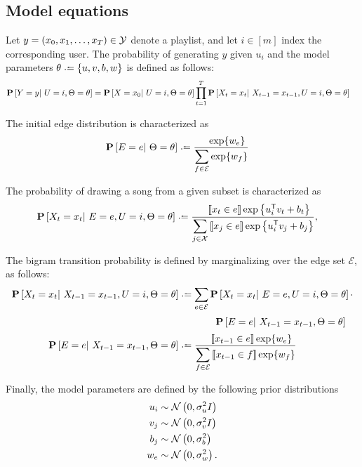 \documentclass{article}
\def\E{\ensuremath{\mathcal{E}}}
\begin{document}
\subsection{Model equations}

Let $y = (x_0, x_1, \dots, x_T) \in \mathcal{Y}$ denote a playlist, and let $i \in [m]$ index the corresponding user.
The probability of generating $y$ given $u_i$ and the model parameters $\theta \defeq \{u, v, b, w\}$ is defined as follows:
\begin{align*}
\mathbf{P}\left[Y = y |~ U = i, \Theta = \theta \right] &= \mathbf{P}\left[X = x_0 |~ U = i, \Theta = \theta\right]
\prod_{t=1}^{T} \mathbf{P}\left[X_t = x_t |~ X_{t-1}=x_{t-1}, U=i, \Theta=\theta \right]
\end{align*}

The initial edge distribution is characterized as
\begin{align*}
\P\left[E = e \given \Theta = \theta\right] & \defeq \frac{\phantom\sum \exp\{w_e\}}{\displaystyle\sum_{f\in \E} \exp\{w_f\}}
\end{align*}

The probability of drawing a song from a given subset is characterized as
\begin{align*}
\P\left[X_t=x_t \given E=e, U=i, \Theta=\theta \right] &\defeq 
\frac{\phantom\sum\ind{x_t \in e}\exp\left\{u_i\trans v_t + b_t\right\}}{\displaystyle\sum_{j \in \X}\ind{x_j \in e} \exp\left\{u_i\trans v_j + b_j\right\}},
\end{align*}

The bigram transition probability is defined by marginalizing over the edge set $\E$, as follows:
\begin{align*}
\P\left[X_{t}= x_t \given X_{t-1}=x_{t-1}, U=i, \Theta=\theta \right] &\defeq \sum_{e \in \E} 
\P\left[X_{t}=x_t \given E=e, U=i, \Theta=\theta\right]\cdot\\
&\phantom{\defeq \sum}\quad\P\left[E=e \given X_{t-1} = x_{t-1}, \Theta=\theta\right]\\
\P\left[E=e \given X_{t-1}=x_{t-1}, \Theta=\theta\right] &\defeq \frac{\phantom\sum\ind{x_{t-1}\in e}\exp\{w_e\}}{ \displaystyle\sum_{f \in \E} \ind{x_{t-1} \in f} \exp\{w_f\} }
\end{align*}

Finally, the model parameters are defined by the following prior distributions
\begin{align*}
u_i &\sim \mathcal{N}\left(0, \sigma^2_u I\right)\\
v_j &\sim \mathcal{N}\left(0, \sigma^2_v I\right)\\
b_j &\sim \mathcal{N}\left(0, \sigma^2_b\right)\\
w_e &\sim \mathcal{N}\left(0, \sigma^2_w\right).\\
\end{align*}
\end{document}
